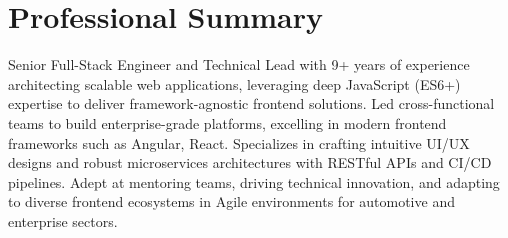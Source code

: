\vspace{-0.6em}
\section{Professional Summary}
\noindent \normalsize Senior Full-Stack Engineer and Technical Lead with 9+ years of experience architecting scalable web applications, leveraging deep JavaScript (ES6+) expertise to deliver framework-agnostic frontend solutions. Led cross-functional teams to build enterprise-grade platforms, excelling in modern frontend frameworks such as Angular, React. Specializes in crafting intuitive UI/UX designs and robust microservices architectures with RESTful APIs and CI/CD pipelines. Adept at mentoring teams, driving technical innovation, and adapting to diverse frontend ecosystems in Agile environments for automotive and enterprise sectors.
\nopagebreak[4]